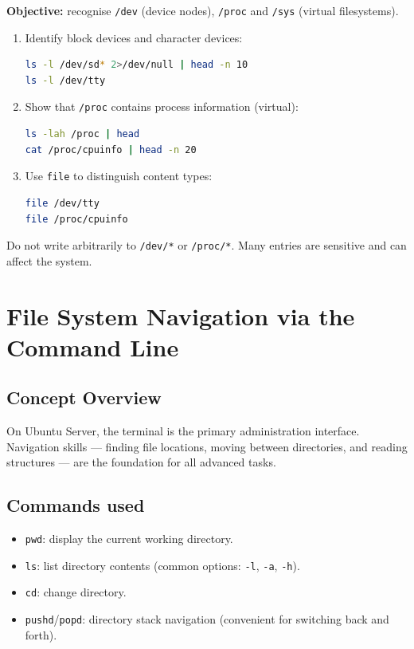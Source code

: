 \textbf{Objective:} recognise \texttt{/dev} (device nodes), \texttt{/proc} and
\texttt{/sys} (virtual filesystems).

\begin{enumerate}
    \item Identify block devices and character devices:
\begin{lstlisting}[language=bash, caption={Block vs character device}]
ls -l /dev/sd* 2>/dev/null | head -n 10
ls -l /dev/tty
\end{lstlisting}

    \item Show that \texttt{/proc} contains process information (virtual):
\begin{lstlisting}[language=bash, caption={Reading system information from /proc}]
ls -lah /proc | head
cat /proc/cpuinfo | head -n 20
\end{lstlisting}

    \item Use \texttt{file} to distinguish content types:
\begin{lstlisting}[language=bash, caption={Testing content type with file}]
file /dev/tty
file /proc/cpuinfo
\end{lstlisting}
\end{enumerate}

\begin{warningbox}
Do not write arbitrarily to \texttt{/dev/*} or \texttt{/proc/*}. Many entries
are sensitive and can affect the system.
\end{warningbox}

\section{File System Navigation via the Command Line}
\label{sec:navigasi}

\subsection*{Concept Overview}
On Ubuntu Server, the terminal is the primary administration interface. Navigation
skills --- finding file locations, moving between directories, and reading
structures --- are the foundation for all advanced tasks.

\subsection*{Commands used}
\begin{itemize}
    \item \texttt{pwd}: display the current working directory.
    \item \texttt{ls}: list directory contents (common options: \texttt{-l}, \texttt{-a}, \texttt{-h}).
    \item \texttt{cd}: change directory.
    \item \texttt{pushd}/\texttt{popd}: directory stack navigation (convenient for switching back and forth).
\end{itemize}


